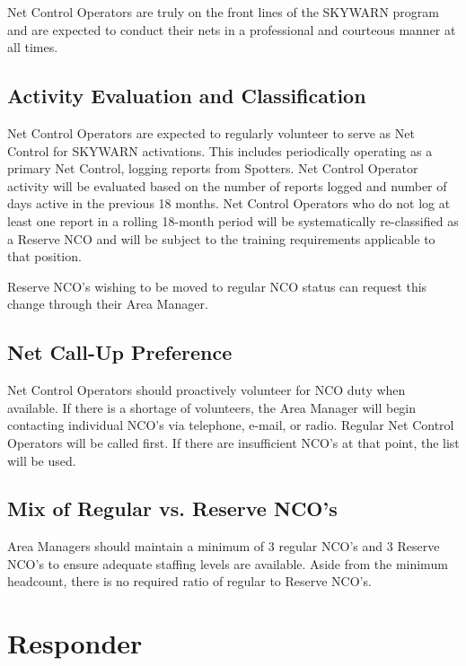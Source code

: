 \documentclass[pdflatex,letterpaper,twoside,12pt]{book}
\begin{document}
Net Control Operators are truly on the front lines of the SKYWARN program and are expected to conduct their nets in a professional and courteous manner at all times.

\subsection{Activity Evaluation and Classification}

Net Control Operators are expected to regularly volunteer to serve as Net Control for SKYWARN activations.  This includes periodically operating as a primary Net Control, logging reports from Spotters.  Net Control Operator activity will be evaluated based on the number of reports logged and number of days active in the previous 18 months.  Net Control Operators who do not log at least one report in a rolling 18-month period will be systematically re-classified as a Reserve NCO and will be subject to the training requirements applicable to that position.

Reserve NCO's wishing to be moved to regular NCO status can request this change through their Area Manager.

\subsection{Net Call-Up Preference}

Net Control Operators should proactively volunteer for NCO duty when available.  If there is a shortage of volunteers, the Area Manager will begin contacting individual NCO's via telephone, e-mail, or radio.  Regular Net Control Operators will be called first.  If there are insufficient NCO's at that point, the  list will be used.

\subsection{Mix of Regular vs. Reserve NCO's}

Area Managers should maintain a minimum of 3 regular NCO's and 3 Reserve NCO's to ensure adequate staffing levels are available.  Aside from the minimum headcount, there is no required ratio of regular to Reserve NCO's.


\section{Responder}
\end{document}
